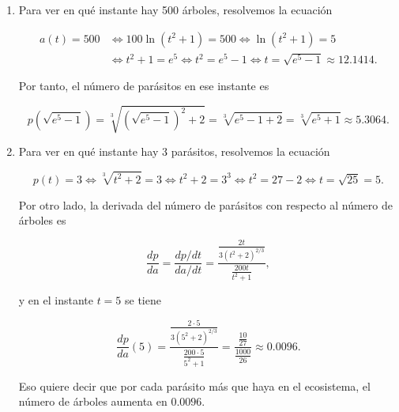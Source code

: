\documentclass[
  spanish,
  a4paper,
]{scrreport}
\theoremstyle{definition}
\theoremstyle{remark}
\begin{document}
\begin{tcolorbox}[enhanced jigsaw, arc=.35mm, bottomrule=.15mm, bottomtitle=1mm, breakable, colback=white, colbacktitle=quarto-callout-tip-color!10!white, colframe=quarto-callout-tip-color-frame, coltitle=black, left=2mm, leftrule=.75mm, opacityback=0, opacitybacktitle=0.6, rightrule=.15mm, title=\textcolor{quarto-callout-tip-color}{\faLightbulb}\hspace{0.5em}{Solución}, titlerule=0mm, toprule=.15mm, toptitle=1mm]

\begin{enumerate}
\def\labelenumi{\alph{enumi}.}
\item
  Para ver en qué instante hay 500 árboles, resolvemos la ecuación

  \begin{align*}
  a(t) = 500 
  &\Leftrightarrow 100\ln(t^2+1) = 500
  \Leftrightarrow \ln(t^2+1) = 5 \\
  &\Leftrightarrow t^2+1 = e^5
  \Leftrightarrow t^2 = e^5-1
  \Leftrightarrow t = \sqrt{e^5-1}
  \approx 12.1414.
  \end{align*}

  Por tanto, el número de parásitos en ese instante es

  \[
  p(\sqrt{e^5-1})
  = \sqrt[3]{(\sqrt{e^5-1})^2  + 2}
  = \sqrt[3]{e^5-1  + 2}
  = \sqrt[3]{e^5+1}
  \approx 5.3064. 
  \]
\item
  Para ver en qué instante hay 3 parásitos, resolvemos la ecuación

  \[
  p(t) = 3 
  \Leftrightarrow \sqrt[3]{t^2+2} = 3
  \Leftrightarrow t^2+2 = 3^3
  \Leftrightarrow t^2 = 27-2
  \Leftrightarrow t = \sqrt{25}
  = 5.
  \]

  Por otro lado, la derivada del número de parásitos con respecto al
  número de árboles es

  \[
  \frac{dp}{da}
  = \frac{dp/dt}{da/dt}
  = \frac{\frac{2t}{3(t^2+2)^{2/3}}}{\frac{200t}{t^2+1}},
  \]

  y en el instante \(t=5\) se tiene

  \[
  \frac{dp}{da}(5) 
  = \frac{\frac{2\cdot 5}{3(5^2+2)^{2/3}}}{\frac{200\cdot 5}{5^2+1}}
  = \frac{\frac{10}{27}}{\frac{1000}{26}}
  \approx 0.0096.
  \]

  Eso quiere decir que por cada parásito más que haya en el ecosistema,
  el número de árboles aumenta en \(0.0096\).
\end{enumerate}

\end{tcolorbox}
\end{document}
